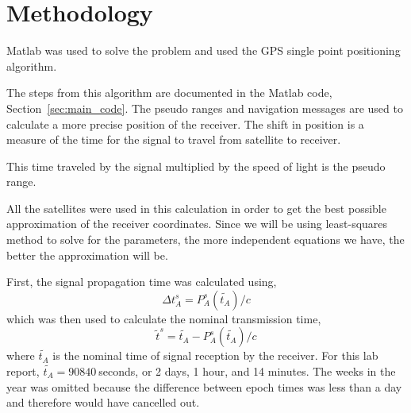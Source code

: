 \section{Methodology} 

\label{sec:methodology}

Matlab was used to solve the problem and used the GPS single point positioning algorithm.\cite{milanGPS} 

The steps from this algorithm are documented in the Matlab code, Section~\ref{sec:main_code}. The pseudo ranges and navigation messages are used to calculate a more precise position of the receiver.  The shift in position is a measure of the time for the signal to travel from satellite to receiver. 

This time traveled by the signal multiplied by the speed of light is the pseudo range.  

All the satellites were used in this calculation in order to get the best possible approximation of the receiver coordinates.  Since we will be using least-squares method to solve for the parameters, the more independent equations we have, the better the approximation will be.  

First, the signal propagation time was calculated using,
\begin{equation*}
	\Delta t_A^s = P_A^s(\tilde{t_A})/c
\end{equation*}
which was then used to calculate the nominal transmission time,
\begin{equation*}
	\tilde{t}^s = \tilde{t_A} - P_A^s(\tilde{t_A})/c
\end{equation*}
where $\tilde{t_A}$ is the nominal time of signal reception by the receiver.  For this lab report, $\tilde{t_A}=90840~$seconds, or 2 days, 1 hour, and 14 minutes.  The weeks in the year was omitted because the difference between epoch times was less than a day and therefore would have cancelled out.

